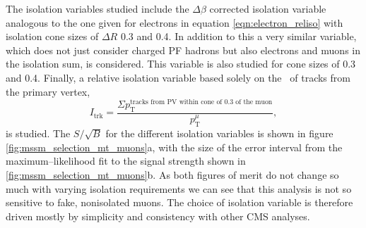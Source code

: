 The isolation variables studied include
the $\Delta\beta$ corrected isolation variable analogous
to the one given for electrons in equation \ref{eqn:electron_reliso} with 
isolation cone sizes of $\Delta R$  0.3 and 0.4. In addition
to this a very similar
variable, which does not just consider charged \ac{PF} hadrons but
also electrons and muons in the isolation sum, is considered. This
variable is also studied for cone sizes of 0.3 and 0.4. Finally,
a relative isolation variable based solely on the \pT~of tracks from the primary
vertex,
\begin{equation}\label{eqn:reltrkiso}
I_{\text{trk}} = \frac{\Sigma p_{\text{T}}^{\text{tracks from PV within cone of 0.3 of the muon}}}{p_{\text{T}}^{\mu}}, \end{equation} 
is studied. The $S/\sqrt{B}$ for the different isolation variables is shown in figure \ref{fig:mssm_selection_mt_muons}a, with the
size of the error interval from the maximum--likelihood fit to the \Ztautau signal strength shown in 
\ref{fig:mssm_selection_mt_muons}b. As both figures of merit do not
change so much with varying isolation requirements we can see that this analysis
is not so sensitive to fake, nonisolated muons. The choice of isolation variable is therefore
driven mostly by simplicity and consistency with other \ac{CMS} analyses.

